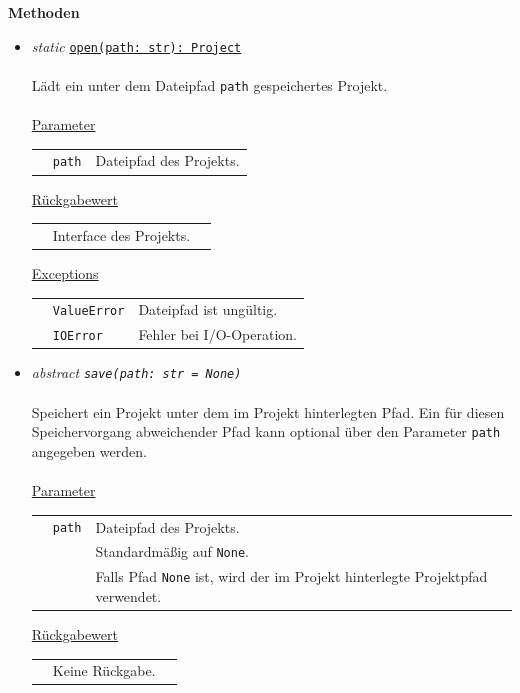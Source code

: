 \documentclass{article}
\begin{document}
\textbf{Methoden}
\begin{itemize}\setlength\itemsep{3em}
\item \textit{\flqq{}static\frqq} \texttt{\underline{open(path: str): Project}}\\\\
Lädt ein unter dem Dateipfad \texttt{path} gespeichertes Projekt.
\\\\
\underline{Parameter}\\
\begin{tabular}{lll}
 & \texttt{path} & Dateipfad des Projekts.\\
\end{tabular}

\underline{Rückgabewert}\\
\begin{tabular}{lll}
 & Interface des Projekts.\\
\end{tabular}

\underline{Exceptions}\\
\begin{tabular}{lll}
 & \texttt{ValueError} & Dateipfad ist ungültig.\\
 & \texttt{IOError} & Fehler bei I/O-Operation.\\
\end{tabular}


\item \textit{\flqq{}abstract\frqq} \texttt{\textit{save(path: str = None)}}\\\\
Speichert ein Projekt unter dem im Projekt hinterlegten Pfad. Ein für diesen Speichervorgang abweichender Pfad kann optional über den Parameter \texttt{path} angegeben werden.
\\\\
\underline{Parameter}\\
\begin{tabular}{lll}
 & \texttt{path} & Dateipfad des Projekts.\\
 && Standardmäßig auf \texttt{None}.\\
 && Falls Pfad \texttt{None} ist, wird der im Projekt hinterlegte Projektpfad verwendet.\\
\end{tabular}

\underline{Rückgabewert}\\
\begin{tabular}{lll}
 & Keine Rückgabe.\\
\end{tabular}


\end{itemize}
\end{document}
